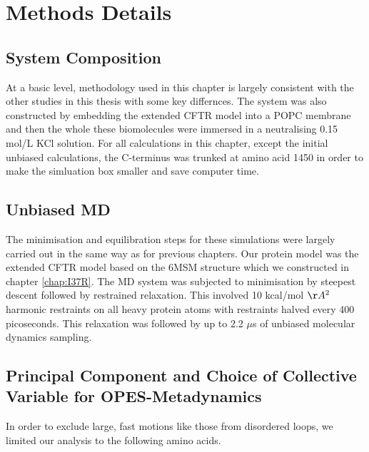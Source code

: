 \section{Methods Details}
\subsection{System Composition}
At a basic level, methodology used in this chapter is largely consistent with the other studies in this thesis with some key differnces. The system was also constructed by embedding the extended CFTR model into a POPC membrane and then the whole these biomolecules were immersed in a neutralising 0.15 mol/L KCl solution. For all calculations in this chapter, except the initial unbiased calculations, the C-terminus was trunked at amino acid 1450 in order to make the simluation box smaller and save computer time.

\subsection{Unbiased MD }
The minimisation and equilibration steps for these simulations were largely carried out in the same way as for previous chapters. Our protein model was the extended CFTR model based on the 6MSM structure \cite{zhang2018} which we constructed in chapter \ref{chap:I37R}. The MD system was subjected to minimisation by steepest descent followed by restrained relaxation. This involved 10 kcal/mol $\AA^2$ harmonic restraints on all heavy protein atoms with restraints halved every 400 picoseconds. This relaxation was followed by up to 2.2 $\mu$s of unbiased molecular dynamics sampling.

\subsection {Principal Component and Choice of Collective Variable for OPES-Metadynamics}
In order to exclude large, fast motions like those from disordered loops, we limited our analysis to the following amino acids.

